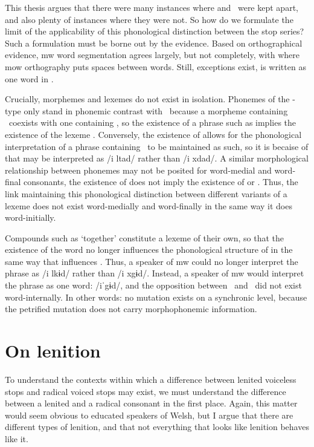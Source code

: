 This thesis argues that there were many instances where \lT
and \xD\ were kept apart, and also plenty of instances where they were not. 
So how do we formulate the limit of the applicability of this phonological distinction between the stop series?
Such a formulation must be borne out by the evidence. Based on orthographical evidence, \gls{mw} word segmentation agrees largely, but not completely, with where \gls{mow} orthography puts spaces between words.
Still, exceptions exist, \eg {} is written as  one word in .

Crucially, morphemes and lexemes do not exist in isolation. 
Phonemes of the \lT -type only stand in phonemic contrast with \xD\ because a morpheme containing \lT\ coexists with one containing \xT, so the existence of a phrase such as  implies the existence of the lexeme .
Conversely, the existence of  allows for the phonological interpretation of a phrase containing \lT\ to be maintained as such, so it is becaise of  that  may be interpreted as /i \gls{l}tad/ rather than /i \gls{x}dad/.
A similar morphological relationship between phonemes may not be posited for word-medial and word-final consonants, \eg the existence of  does not imply the existence of  or .
Thus, the link maintaining this phonological distinction between different variants of a lexeme does not exist word-medially and word-finally in the same way it does word-initially.

Compounds such as  `together' constitute a lexeme of their own, so that the existence of the word  no longer influences the phonological structure of  in the same way that  influences .  Thus, a speaker of \gls{mw} could no longer  interpret the phrase  as /i \gls{l}kɨd/ rather than /i \gls{x}gɨd/. Instead, a speaker of \gls{mw} would interpret the phrase as one word: /iˈgɨd/, and the opposition between \lT\ and \xD\ did not exist word-internally. In other words:  no mutation exists on a synchronic level, because the petrified mutation does not carry morphophonemic information.

\section{On lenition}
\label{sec:lenition}
To understand the contexts within which a difference between lenited voiceless stops and radical voiced stops may exist,
we must understand  the difference between a lenited and a radical consonant  in the first place. 
Again, this matter would seem obvious to educated speakers of Welsh, 
but I  argue that there are different types of lenition, 
and that not everything that looks like lenition behaves like it.

